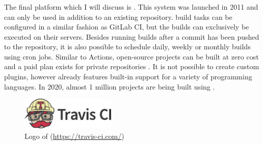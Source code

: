 
\subsubsection{\travisci}
\label{sssec:travisci}
The final \CI{} platform which I will discuss is \travisci{}. This \CI{} system was launched in 2011 and can only be used in addition to an existing \github{} repository. \travisci{} build tasks can be configured in a similar fashion as GitLab CI, but the builds can exclusively be executed on their servers. Besides running builds after a commit has been pushed to the repository, it is also possible to schedule daily, weekly or monthly builds using cron jobs. Similar to \github{} Actions, open-source projects can be built at zero cost and a paid plan exists for private repositories \cite{travisanalysis}. It is not possible to create custom plugins, however \travisci{} already features built-in support for a variety of programming languages. In 2020, almost 1 million projects are being built using \travisci{} \cite{travis2020}.

\begin{figure}[htbp!]
	\centering
	\includegraphics[width=0.40\textwidth]{assets/images/travis-ci.pdf}
	\caption{Logo of \travisci{} (\url{https://travis-ci.com/})}
	\label{fig:travis-ci}
\end{figure}
